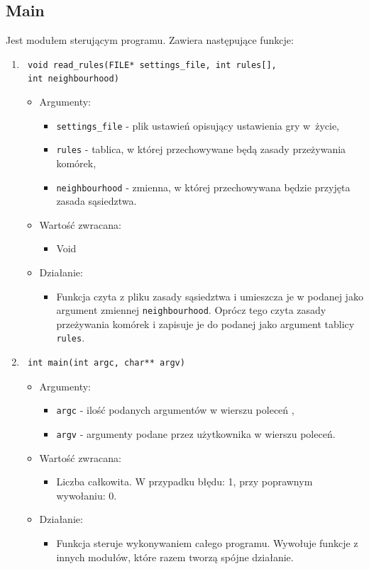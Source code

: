 \documentclass[a4paper,11pt, notitlepage ]{article}
\begin{document}
\subsection{Main}
Jest modułem sterującym programu. Zawiera następujące funkcje:
\begin{enumerate}

\item \verb+ void read_rules(FILE* settings_file, int rules[],+ \\\verb+ int neighbourhood)+
\begin{itemize}
\item Argumenty:
\begin{itemize}
\item \verb+settings_file+ - plik ustawień opisujący ustawienia gry w~życie,
\item \verb+rules+ - tablica, w której przechowywane będą zasady przeżywania komórek,
\item \verb+neighbourhood+ - zmienna, w której przechowywana będzie przyjęta zasada sąsiedztwa.
\end{itemize}
\item Wartość zwracana:
\begin{itemize}
\item Void
\end{itemize}
\item Działanie:
\begin{itemize}
\item Funkcja czyta z pliku zasady sąsiedztwa i umieszcza je w podanej jako argument zmiennej \verb+neighbourhood+.
Oprócz tego czyta zasady przeżywania komórek i zapisuje je do podanej jako argument tablicy \verb+rules+. 
\end{itemize}
\end{itemize}


\item \begin{verbatim} int main(int argc, char** argv) \end{verbatim}
\begin{itemize}
\item Argumenty:
\begin{itemize}
\item \verb+argc+ - ilość podanych argumentów w wierszu poleceń ,
\item \verb+argv+ - argumenty podane przez użytkownika w wierszu poleceń.
\end{itemize}
\item Wartość zwracana:
\begin{itemize}
\item Liczba całkowita. W przypadku błędu: 1, przy poprawnym wywołaniu: 0.
\end{itemize}
\item Działanie:
\begin{itemize}
\item Funkcja steruje wykonywaniem całego programu. Wywołuje funkcje z innych modułów, które razem tworzą spójne działanie. 
\end{itemize}
\end{itemize}

\end{enumerate}
\end{document}
